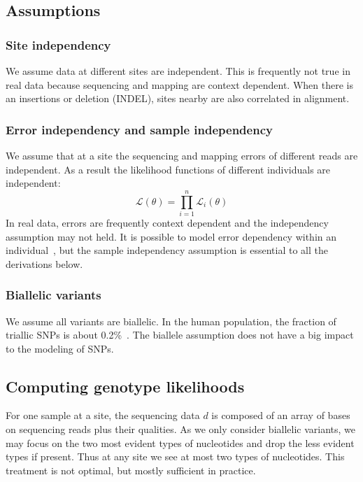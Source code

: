 \documentclass{bioinfo}
\begin{document}
\begin{methods}
\subsection{Assumptions}

\subsubsection{Site independency} We assume data at different sites are independent.
This is frequently not true in real data because sequencing and mapping are context
dependent. When there is an insertions or deletion (INDEL), sites nearby are also
correlated in alignment.

\subsubsection{Error independency and sample independency}
We assume that at a site the sequencing and mapping errors of different reads
are independent. As a result the likelihood functions of
different individuals are independent:
\begin{equation}
\mathcal{L}(\theta)=\prod_{i=1}^n\mathcal{L}_i(\theta)
\end{equation}
In real data, errors are frequently context dependent and the independency assumption
may not held. It is possible to model error dependency within an individual~\citep{Li:2008zr},
but the sample independency assumption is essential to all the derivations below.

\subsubsection{Biallelic variants}
We assume all variants are biallelic. In the human population, the fraction
of triallic SNPs is about 0.2\%~\citep{Hodgkinson:2010uq}. The biallele assumption
does not have a big impact to the modeling of SNPs.

\subsection{Computing genotype likelihoods}

For one sample at a site, the sequencing data $d$ is composed of
an array of bases on sequencing reads plus their qualities. As
we only consider biallelic variants, we may focus on the two most
evident types of nucleotides and drop the less evident types if present. Thus
at any site we see at most two types of nucleotides. This treatment
is not optimal, but mostly sufficient in practice.


\end{methods}
\end{document}
